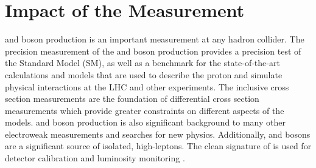 \section{Impact of the Measurement}
\W and \Z boson production is an important measurement at any hadron collider. The precision measurement of the \W and \Z boson production provides a precision test of the Standard Model (SM), as well as a benchmark for the state-of-the-art calculations and models that are used to describe the proton and simulate physical interactions at the LHC and other experiments. The inclusive cross section measurements are the foundation of differential cross section measurements which provide greater constraints on different aspects of the models.  \W and \Z boson production is also significant background to many other electroweak measurements and searches for new physics.
Additionally, \W and \Z bosons are a significant source of isolated, high-\pt leptons. The clean signature of \zll is used for detector calibration and luminosity monitoring \cite{xinmei}.
